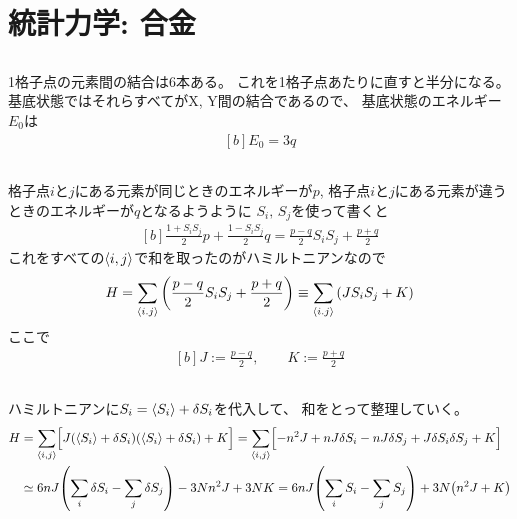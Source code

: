 \documentclass[../ap_2008.tex]{subfiles}
\begin{document}
\chapter{統計力学: 合金}
\section{}
1格子点の元素間の結合は6本ある。
これを1格子点あたりに直すと半分になる。
基底状態ではそれらすべてがX, Y間の結合であるので、
基底状態のエネルギー\(E_0\)は
\begin{equation}\begin{aligned}[b]
    E_0 = 3q
\end{aligned}\end{equation}

\section{}
格子点\(i\)と\(j\)にある元素が同じときのエネルギーが\(p\),
格子点\(i\)と\(j\)にある元素が違うときのエネルギーが\(q\)となるようように
\(S_i,\,S_j\)を使って書くと
\begin{equation}\begin{aligned}[b]
    \frac{1+S_iS_j}{2}p + \frac{1-S_iS_j}{2}q = \frac{p-q}{2}S_iS_j + \frac{p+q}{2}
\end{aligned}\end{equation}
これをすべての\(\ev{i,j}\)で和を取ったのがハミルトニアンなので
\begin{equation}\begin{aligned}[b]
    H = \sum_{\ev{i.j}}\qty(\frac{p-q}{2}S_iS_j + \frac{p+q}{2})
    \equiv \sum_{\ev{i.j}}\qty(JS_iS_j + K)
\end{aligned}\end{equation}
ここで
\begin{equation}\begin{aligned}[b]
    J := \frac{p-q}{2},\qquad  K := \frac{p+q}{2}
\end{aligned}\end{equation}

\section{}
ハミルトニアンに\(S_i = \ev{S_i}+\delta S_i\)を代入して、
和をとって整理していく。
\begin{equation}\begin{aligned}[b]
    H &= \sum_{\ev{i,j}}\Bigl[J\qty(\ev{S_i}+\delta S_i)(\ev{S_i}+\delta S_i)+K\Bigr]
    = \sum_{\ev{i,j}}\Bigl[-n^2J+nJ\delta S_i-nJ\delta S_j +J\delta S_i \delta S_j+K\Bigr]\\
    &\simeq 6nJ\qty(\sum_i \delta S_i - \sum_j \delta S_j)-3Nn^2J+3NK
    = 6nJ\qty(\sum_i S_i - \sum_j S_j)+3N\qty(n^2J+K)
\end{aligned}\end{equation}
\end{document}
